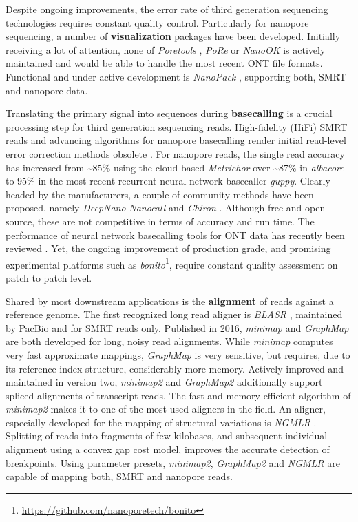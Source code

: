 Despite ongoing improvements, the error rate of third generation sequencing technologies requires constant quality control. Particularly for nanopore sequencing, a number of \textbf{visualization} packages have been developed.
Initially receiving a lot of attention, none of \textit{Poretools} \cite{Loman2014},
\textit{PoRe} \cite{Watson2014} or \textit{NanoOK} \cite{Leggett2016} is actively maintained and would be able to handle the most recent ONT file formats.
Functional and under active development is \textit{NanoPack} \cite{DeCoster2018}, supporting both, SMRT and nanopore data.

Translating the primary signal into sequences during \textbf{basecalling} is a crucial processing step for third generation sequencing reads.
High-fidelity (HiFi) SMRT reads and advancing algorithms for nanopore basecalling render initial read-level error correction methods obsolete \cite{Koren2012, Hackl2014, Goodwin2015}.
For nanopore reads, the single read accuracy has increased from \textasciitilde85\% using the cloud-based \textit{Metrichor} over \textasciitilde87\% in \textit{albacore} to 95\% in the most recent recurrent neural network basecaller \textit{guppy}.
Clearly headed by the manufacturers, a couple of community methods have been proposed, namely 
\textit{DeepNano} \cite{Boza2017} \textit{Nanocall} \cite{David2017} and \textit{Chiron} \cite{Teng2018}.
Although free and open-source, these are not competitive in terms of accuracy and run time.
The performance of neural network basecalling tools for ONT data has recently been reviewed \cite{Wick2019}.
Yet, the ongoing improvement of production grade, and promising experimental platforms such as \textit{bonito}\footnote{\url{https://github.com/nanoporetech/bonito}}, require constant quality assessment on patch to patch level.

Shared by most downstream applications is the \textbf{alignment} of reads against a reference genome.
The first recognized long read aligner is \textit{BLASR} \cite{Chaisson2012}, maintained by PacBio and for SMRT reads only.
Published in 2016, \textit{minimap} \cite{Li2016} and \textit{GraphMap} \cite{Sovic2016} are both developed for long, noisy read alignments.
While \textit{minimap} computes very fast approximate mappings, \textit{GraphMap} is very sensitive, but requires, due to its reference index structure, considerably more memory.
Actively improved and maintained in version two, \textit{minimap2} \cite{Li2018} and \textit{GraphMap2} \cite{Maric2019} additionally support spliced alignments of transcript reads.
The fast and memory efficient algorithm of \textit{minimap2} makes it to one of the most used aligners in the field.
An aligner, especially developed for the mapping of structural variations is \textit{NGMLR} \cite{Sedlazeck2018}.
Splitting of reads into fragments of few kilobases, and subsequent individual alignment using a convex gap cost model, improves the accurate detection of breakpoints.
Using parameter presets, \textit{minimap2}, \textit{GraphMap2} and \textit{NGMLR} are capable of mapping both, SMRT and nanopore reads.




